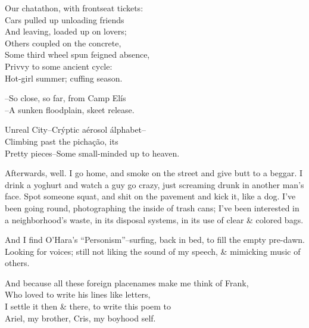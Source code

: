 Our chatathon, with frontseat tickets: \\
Cars pulled up unloading friends \\
And leaving, loaded up on lovers; \\
Others coupled on the concrete, \\
Some third wheel spun feigned absence, \\
Privvy to some ancient cycle: \\
Hot-girl summer; cuffing season.

--So close, so far, from Camp Elís \\
--A sunken floodplain, skeet release. %

Unreal City--Crýptic aérosol álphabet-- \\
Climbing past the pichação, its \\
Pretty pieces--Some small-minded up to heaven.

Afterwards, well. I go home, and smoke on the street and give butt to a beggar. I drink a yoghurt and watch a guy go crazy, just screaming drunk in another man's face. Spot someone squat, and shit on the pavement and kick it, like a dog. I've been going round, photographing the inside of trash cans; I've been interested in a neighborhood's waste, in its disposal systems, in its use of clear \& colored bags.

And I find O'Hara's ``Personism''--surfing, back in bed, to fill the empty pre-dawn. Looking for voices; still not liking the sound of my speech, \& mimicking music of others.

And because all these foreign placenames make me think of Frank, \\
Who loved to write his lines like letters, \\
I settle it then \& there, to write this poem to \\
Ariel, my brother, Cris, my boyhood self.